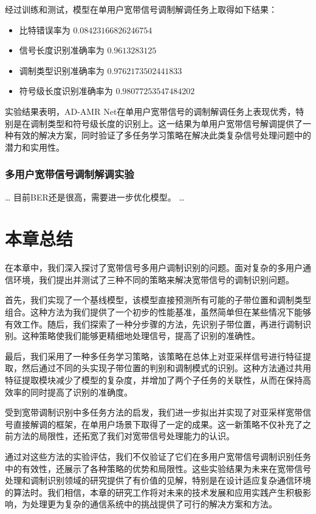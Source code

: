 经过训练和测试，模型在单用户宽带信号调制解调任务上取得如下结果：
\begin{itemize}
    \item 比特错误率为 \(0.08423166826246754\)
    \item 信号长度识别准确率为 \(0.9613283125\)
    \item 调制类型识别准确率为 \(0.9762173502441833\)
    \item 符号级长度识别准确率为 \(0.98077253547484202\)
\end{itemize}

实验结果表明，AD-AMR Net在单用户宽带信号的调制解调任务上表现优秀，特别是在调制类型和符号级长度的识别上。这一结果为单用户宽带信号解调提供了一种有效的解决方案，同时验证了多任务学习策略在解决此类复杂信号处理问题中的潜力和实用性。

\subsubsection{多用户宽带信号调制解调实验}
\dots
目前BER还是很高，需要进一步优化模型。
\dots

\section{本章总结}\label{sec:background}
在本章中，我们深入探讨了宽带信号多用户调制识别的问题。面对复杂的多用户通信环境，我们提出并测试了三种不同的策略来解决宽带信号的调制识别问题。

首先，我们实现了一个基线模型，该模型直接预测所有可能的子带位置和调制类型组合。这种方法为我们提供了一个初步的性能基准，虽然简单但在某些情况下能够有效工作。随后，我们探索了一种分步骤的方法，先识别子带位置，再进行调制识别。这种策略使我们能够更精细地处理信号，提高了识别的准确性。

最后，我们采用了一种多任务学习策略，该策略在总体上对亚采样信号进行特征提取，然后通过不同的头实现子带位置的判别和调制模式的识别。这种方法通过共用特征提取模块减少了模型的复杂度，并增加了两个子任务的关联性，从而在保持高效率的同时提高了识别的准确度。

受到宽带调制识别中多任务方法的启发，我们进一步拟出并实现了对亚采样宽带信号直接解调的框架，在单用户场景下取得了一定的成果。这一新策略不仅补充了之前方法的局限性，还拓宽了我们对宽带信号处理能力的认识。

通过对这些方法的实验评估，我们不仅验证了它们在多用户宽带信号调制识别任务中的有效性，还展示了各种策略的优势和局限性。这些实验结果为未来在宽带信号处理和调制识别领域的研究提供了有价值的见解，特别是在设计适应复杂通信环境的算法时。我们相信，本章的研究工作将对未来的技术发展和应用实践产生积极影响，为处理更为复杂的通信系统中的挑战提供了可行的解决方案和方法。
